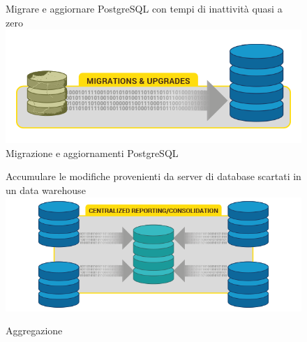 \begin{figure}[htbp]
\centering
Migrare e aggiornare PostgreSQL con tempi di inattivit\`{a} quasi a zero
\includegraphics[scale=0.70]{img/pglogical_1.png}\\

\caption{Migrazione e aggiornamenti PostgreSQL \label{figura1} \cite{etichetta3}}

Accumulare le modifiche provenienti da server di database scartati in un data warehouse
\includegraphics[scale=0.70]{img/pglogical_2.png}\\

\caption{Aggregazione \label{figura2} \cite{etichetta3}}
\end{figure}

